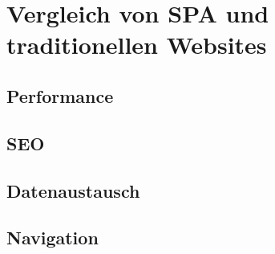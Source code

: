 \section{Vergleich von \ac{SPA} und traditionellen Websites}
\subsection{Performance}
\subsection{\ac{SEO}}
\subsection{Datenaustausch}
\subsection{Navigation}